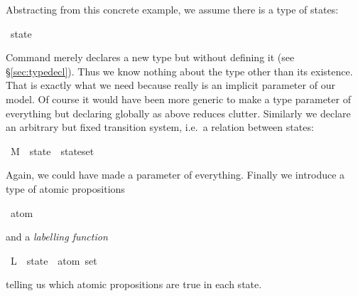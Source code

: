 \begin{isabellebody}
\begin{isamarkuptext}
Abstracting from this concrete example, we assume there is a type of
states:%
\end{isamarkuptext}%
\isamarkuptrue%
\isamarkupfalse%
\ state%
\begin{isamarkuptext}%
\noindent
Command  merely declares a new type but without
defining it (see \S\ref{sec:typedecl}). Thus we know nothing
about the type other than its existence. That is exactly what we need
because  really is an implicit parameter of our model.  Of
course it would have been more generic to make  a type
parameter of everything but declaring  globally as above
reduces clutter.  Similarly we declare an arbitrary but fixed
transition system, i.e.\ a relation between states:%
\end{isamarkuptext}%
\isamarkuptrue%
\isamarkupfalse%
\ M\ {\isacharcolon}{\isacharcolon}\ {\isachardoublequoteopen}{\isacharparenleft}state\ {\isasymtimes}\ state{\isacharparenright}set{\isachardoublequoteclose}%
\begin{isamarkuptext}%
\noindent
Again, we could have made  a parameter of everything.
Finally we introduce a type of atomic propositions%
\end{isamarkuptext}%
\isamarkuptrue%
\isamarkupfalse%
\ {\isachardoublequoteopen}atom{\isachardoublequoteclose}%
\begin{isamarkuptext}%
\noindent
and a \emph{labelling function}%
\end{isamarkuptext}%
\isamarkuptrue%
\isamarkupfalse%
\ L\ {\isacharcolon}{\isacharcolon}\ {\isachardoublequoteopen}state\ {\isasymRightarrow}\ atom\ set{\isachardoublequoteclose}%
\begin{isamarkuptext}%
\noindent
telling us which atomic propositions are true in each state.%
\end{isamarkuptext}%
\isamarkuptrue%
%
\isadelimtheory
%
\endisadelimtheory
%
\isatagtheory
%
\endisatagtheory
{\isafoldtheory}%
%
\isadelimtheory
%
\endisadelimtheory
\end{isabellebody}%
